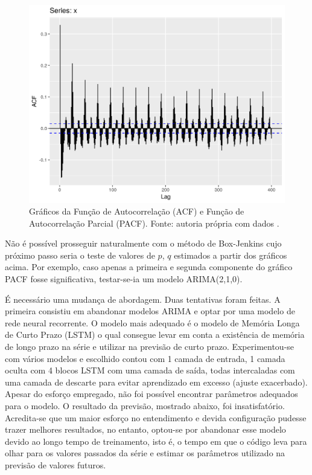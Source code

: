 \documentclass[
	12pt,				%
	openright,			%
	oneside,			%
	a4paper,			%
	english,			%
	french,				%
	spanish,			%
	brazil				%
	]{abntex2}
\begin{document}
\begin{figure}[h]
    \centering
	\includegraphics[width=\textwidth]{long_memory_lagmax.png}
	\caption{Gráficos da Função de Autocorrelação (ACF) e Função de Autocorrelação Parcial (PACF). Fonte: autoria própria com dados \cite{era5}.}
\end{figure}
\FloatBarrier 

Não é possível prosseguir naturalmente com o método de Box-Jenkins cujo próximo passo seria o teste de valores de $p$, $q$ estimados a partir dos gráficos acima. Por exemplo, caso apenas a primeira e segunda componente do gráfico PACF fosse significativa, testar-se-ia um modelo ARIMA(2,1,0).

É necessário uma mudança de abordagem. Duas tentativas foram feitas. A primeira consistiu em abandonar modelos ARIMA e optar por uma modelo de rede neural recorrente. O modelo mais adequado é o modelo de Memória Longa de Curto Prazo (LSTM) o qual consegue levar em conta a existência de memória de longo prazo na série e utilizar na previsão de curto prazo. Experimentou-se com vários modelos e escolhido contou com 1 camada de entrada, 1 camada oculta com 4 blocos LSTM com uma camada de saída, todas intercaladas com uma camada de descarte para evitar aprendizado em excesso (ajuste exacerbado). Apesar do esforço empregado, não foi possível encontrar parâmetros adequados para o modelo. O resultado da previsão, mostrado abaixo, foi insatisfatório. Acredita-se que um maior esforço no entendimento e devida configuração pudesse trazer melhores resultados, no entanto, optou-se por abandonar esse modelo devido ao longo tempo de treinamento, isto é, o tempo em que o código leva para olhar para os valores passados da série e estimar os parâmetros utilizado na previsão de valores futuros.
\end{document}
